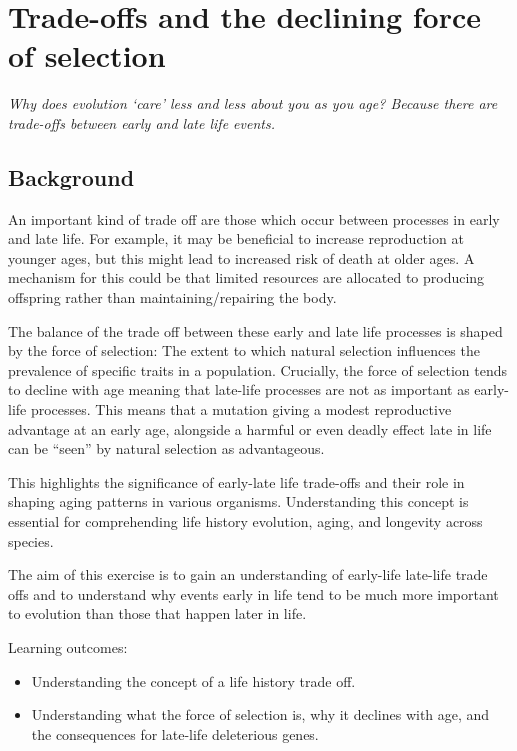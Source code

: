 \documentclass[
  a4paper]{book}
\providecommand{\tightlist}{%
  \setlength{\itemsep}{0pt}\setlength{\parskip}{0pt}}
\begin{document}
\chapter{Trade-offs and the declining force of selection}\label{trade-offs-and-the-declining-force-of-selection}

\emph{Why does evolution `care' less and less about you as you age? Because there are trade-offs between early and late life events. }

\section{Background}\label{background-10}

An important kind of trade off are those which occur between processes in early and late life. For example, it may be beneficial to increase reproduction at younger ages, but this might lead to increased risk of death at older ages. A mechanism for this could be that limited resources are allocated to producing offspring rather than maintaining/repairing the body.

The balance of the trade off between these early and late life processes is shaped by the force of selection: The extent to which natural selection influences the prevalence of specific traits in a population. Crucially, the force of selection tends to decline with age meaning that late-life processes are not as important as early-life processes. This means that a mutation giving a modest reproductive advantage at an early age, alongside a harmful or even deadly effect late in life can be ``seen'' by natural selection as advantageous.

This highlights the significance of early-late life trade-offs and their role in shaping aging patterns in various organisms. Understanding this concept is essential for comprehending life history evolution, aging, and longevity across species.

The aim of this exercise is to gain an understanding of early-life late-life trade offs and to understand why events early in life tend to be much more important to evolution than those that happen later in life.

\begin{do-something}
Learning outcomes:

\begin{itemize}
\tightlist
\item
  Understanding the concept of a life history trade off.
\item
  Understanding what the force of selection is, why it declines with
  age, and the consequences for late-life deleterious genes.
\end{itemize}
\end{do-something}
\end{document}
